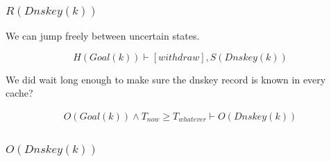 \documentclass[twoside,english, a4paper]{article}
\newcommand{\mathbox}[1]{#1}
\begin{document}
\subsubsection{$R(Dnskey(k))$}

\mathbox{

	We can jump freely between uncertain states.
	
	\begin{equation}
			H(Goal(k)) \vdash [withdraw], S(Dnskey(k))
	\end{equation}

	We did wait long enough to make sure the dnskey record is known in 
	every cache?
	
	\begin{equation}
		\begin{split}
			O(Goal(k)) \wedge T_{now} \geq T_{whatever} \vdash O(Dnskey(k))
		\end{split}
	\end{equation}
}

\subsubsection{$O(Dnskey(k))$}
\end{document}
